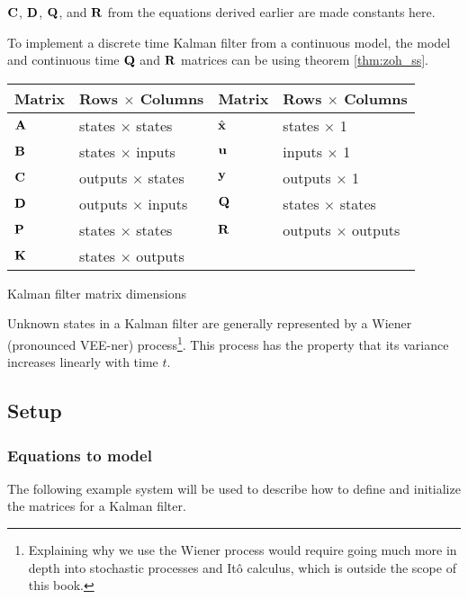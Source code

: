 $\mathbf{C}$, $\mathbf{D}$, $\mathbf{Q}$, and $\mathbf{R}$ from the equations derived
earlier are made constants here.
\begin{remark}
  To implement a discrete time Kalman filter from a continuous model, the model
  and continuous time $\mathbf{Q}$ and $\mathbf{R}$ matrices can be
   using theorem \ref{thm:zoh_ss}.
\end{remark}
\begin{booktable}
  \begin{tabular}{|ll|ll|}
    \hline
    \rowcolor{headingbg}
    \textbf{Matrix} & \textbf{Rows $\times$ Columns} &
    \textbf{Matrix} & \textbf{Rows $\times$ Columns} \\
    \hline
    $\mathbf{A}$ & states $\times$ states & $\hat{\mathbf{x}}$ & states $\times$ 1 \\
    $\mathbf{B}$ & states $\times$ inputs & $\mathbf{u}$ & inputs $\times$ 1 \\
    $\mathbf{C}$ & outputs $\times$ states & $\mathbf{y}$ & outputs $\times$ 1 \\
    $\mathbf{D}$ & outputs $\times$ inputs & $\mathbf{Q}$ & states $\times$ states \\
    $\mathbf{P}$ & states $\times$ states & $\mathbf{R}$ & outputs $\times$ outputs \\
    $\mathbf{K}$ & states $\times$ outputs & &
      \\
    \hline
  \end{tabular}
  \caption{Kalman filter matrix dimensions}
\end{booktable}

Unknown \glspl{state} in a Kalman filter are generally represented by a Wiener
(pronounced VEE-ner) process\footnote{Explaining why we use the Wiener process
would require going much more in depth into stochastic processes and It\^{o}
calculus, which is outside the scope of this book.}. This process has the
property that its variance increases linearly with time $t$.

\subsection{Setup}

\subsubsection{Equations to model}

The following example \gls{system} will be used to describe how to define and
initialize the matrices for a Kalman filter.

